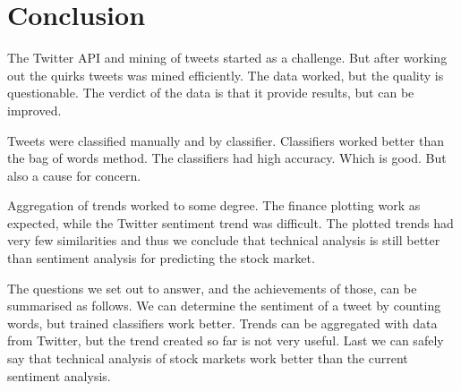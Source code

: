 \chapter{Conclusion}\label{conclusion}

The Twitter API and mining of tweets started as a challenge. But after
working out the quirks tweets was mined efficiently. The data worked,
but the quality is questionable. The verdict of the data is that it
provide results, but can be improved.    

Tweets were classified manually and by classifier. Classifiers worked better
than the bag of words method. The classifiers had high accuracy. Which is good.
But also a cause for concern. 

Aggregation of trends worked to some degree. The finance plotting work as
expected, while the Twitter sentiment trend was difficult. The plotted trends had very
few similarities and thus we conclude that technical analysis is still better
than sentiment analysis for predicting the stock market.  

The questions we set out to answer, and the achievements of those, can be
summarised as follows. We can determine the sentiment of a tweet by counting
words, but trained classifiers work better. Trends can be aggregated with data
from Twitter, but the trend created so far is not very useful. Last we can
safely say that technical analysis of stock markets work better than the current
sentiment analysis.  
